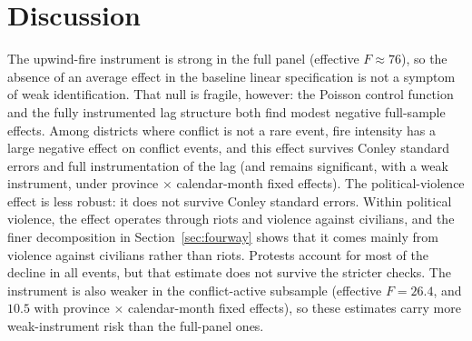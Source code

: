 \documentclass[12pt]{article}
\begin{document}
\section{Discussion}
\label{sec:discussion}

The upwind-fire instrument is strong in the full panel (effective $F \approx 76$), so the absence of an average effect in the baseline linear specification is not a symptom of weak identification. That null is fragile, however: the Poisson control function and the fully instrumented lag structure both find modest negative full-sample effects. Among districts where conflict is not a rare event, fire intensity has a large negative effect on conflict events, and this effect survives Conley standard errors and full instrumentation of the lag (and remains significant, with a weak instrument, under province $\times$ calendar-month fixed effects). The political-violence effect is less robust: it does not survive Conley standard errors. Within political violence, the effect operates through riots and violence against civilians, and the finer decomposition in Section~\ref{sec:fourway} shows that it comes mainly from violence against civilians rather than riots. Protests account for most of the decline in all events, but that estimate does not survive the stricter checks. The instrument is also weaker in the conflict-active subsample (effective $F = 26.4$, and $10.5$ with province $\times$ calendar-month fixed effects), so these estimates carry more weak-instrument risk than the full-panel ones.
\end{document}

